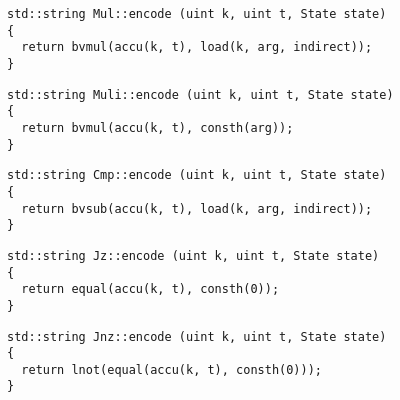 
\newpage

\begin{lstlisting}[style=c++, style=encode]
std::string Mul::encode (uint k, uint t, State state)
{
  return bvmul(accu(k, t), load(k, arg, indirect));
}
\end{lstlisting}


\begin{lstlisting}[style=c++, style=encode]
std::string Muli::encode (uint k, uint t, State state)
{
  return bvmul(accu(k, t), consth(arg));
}
\end{lstlisting}


\begin{lstlisting}[style=c++, style=encode]
std::string Cmp::encode (uint k, uint t, State state)
{
  return bvsub(accu(k, t), load(k, arg, indirect));
}
\end{lstlisting}




\begin{lstlisting}[style=c++, style=encode]
std::string Jz::encode (uint k, uint t, State state)
{
  return equal(accu(k, t), consth(0));
}
\end{lstlisting}


\begin{lstlisting}[style=c++, style=encode]
std::string Jnz::encode (uint k, uint t, State state)
{
  return lnot(equal(accu(k, t), consth(0)));
}
\end{lstlisting}

